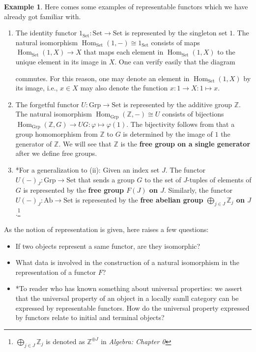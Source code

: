 \documentclass{article}
\theoremstyle{definition}
\theoremstyle{definition}
\newtheorem{example}{Example}[section]
\theoremstyle{remark}
\DeclareMathOperator{\Hom}{Hom}
\begin{document}
	\begin{example}
	Here comes some examples of representable functors which we have already got familiar with.
		\begin{enumerate}[label=(\roman*)]
			\item The identity functor $1_\mathrm{Set}:\mathrm{Set}\to\mathrm{Set}$ is represented by the singleton set $1$. The natural isomorphism $\Hom_\mathrm{Set}(1,-)\cong 1_\mathrm{Set}$ consists of maps $\Hom_\mathrm{Set}(1,X)\to X$ that maps each element in $\Hom_\mathrm{Set}(1,X)$ to the unique element in its image in $X$. One can verify easily that the diagram 
			\begin{center}
			\end{center}
		commutes. For this reason, one may denote an element in $\Hom_\mathrm{Set}(1,X)$ by its image, i.e., $x\in X$ may also denote the function $x:1\to X:1\mapsto x$.
		\item The forgetful functor $U:\mathrm{Grp}\to \mathrm{Set}$ is represented by the additive group $\mathbb{Z}$. The natural isomorphism $\Hom_\mathrm{Grp}(\mathbb{Z},-)\cong U$ consists of bijections $\Hom_\mathrm{Grp}(\mathbb{Z},G)\to UG:\varphi\mapsto \varphi(1)$. The bijectivity follows from that a group homomorphism from $\mathbb{Z}$ to $G$ is determined by the image of $1$ the generator of $\mathbb{Z}$. We will see that $\mathbb{Z}$ is the \textbf{free group on a single generator} after we define free groups.
		\item *For a generalization to (ii): Given an index set $J$. The functor $U(-)_J:\mathrm{Grp}\to\mathrm{Set}$ that sends a group $G$ to the set of $J$-tuples of elements of $G$ is represented by the \textbf{free group $F(J)$ on $J$}. Similarly, the functor $U(-)_J:\mathrm{Ab}\to \mathrm{Set}$ is represented by the \textbf{free abelian group $\bigoplus_{j\in J}\mathbb{Z}_j$ on $J$}.\footnote{$\bigoplus_{j\in J}\mathbb{Z}_j$ is denoted as $\mathbb{Z}^{\oplus J}$ in \textsl{Algebra: Chapter 0}}
		\end{enumerate}
	\end{example}
	As the notion of representation is given, here raises a few questions:
	\begin{itemize}
		\item If two objects represent a same functor, are they isomorphic?
		\item What data is involved in the construction of a natural isomorphism in the representation of a functor $F$?
		\item *To reader who has known something about universal properties: we assert that the universal property of an object in a locally samll category can be expressed by representable functors. How do the universal property expressed by functors relate to initial and terminal objects?
	\end{itemize}
\end{document}
